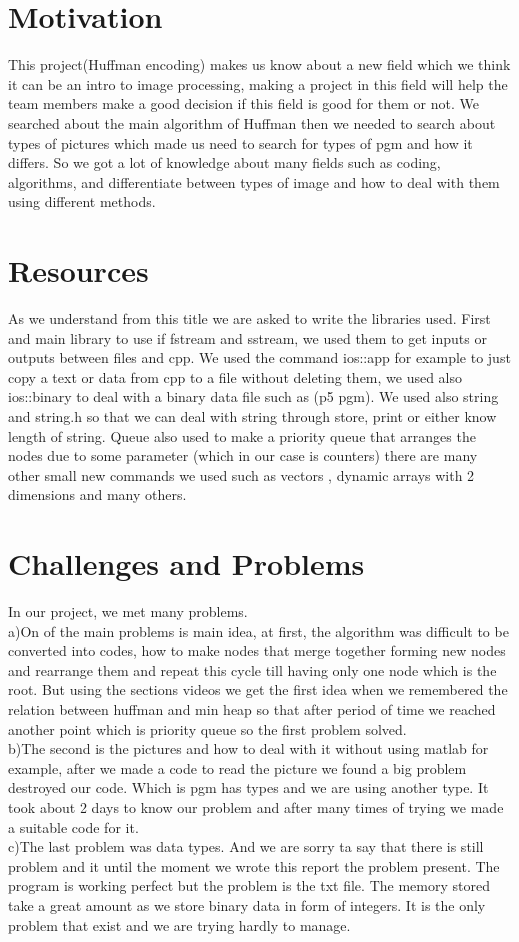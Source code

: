\documentclass[11 pt,twocolumn,letterpaper]{article}
\begin{document}
\section{Motivation}
   This project(Huffman encoding) makes us know about a new field which we think it can be an intro to image processing, making a project in this field will help the team members make a good decision if this field is good for them or not.
We searched about the main algorithm of Huffman then we needed to search about types of pictures which made us need to search for types of pgm and how it differs.
So we got a lot of knowledge about many fields such as coding, algorithms, and differentiate between types of image and how to deal with them using different methods.
\section{Resources}
  As we understand from this title we are asked to write the libraries used.
First and main library to use if fstream and sstream, we used them to get inputs or outputs between files and cpp.
We used the command ios::app for example to just copy a text or data from cpp to a file without deleting them, we used also ios::binary to deal with a binary data file such as (p5 pgm).
We used also string and string.h so that we can deal with string through store, print or either know length of string.
Queue also used to make a priority queue that arranges the nodes due to some parameter (which in our case is counters)
there are many other small new commands we used such as vectors , dynamic arrays with 2 dimensions and many others.
\section{Challenges and Problems}
In our project, we met many problems.\\
a)On of the main problems is main idea, at first, the algorithm was difficult to be converted into codes, how to make nodes that merge together forming new nodes and rearrange them and repeat this cycle till having only one node which is the root.
But using the sections videos we get the first idea when we remembered the relation between huffman and min heap so that after period of time we reached another point which is priority queue so the first problem solved.\\
b)The second is the pictures and how to deal with it without using matlab for example, after we made a code to read the picture we found a big problem destroyed our code. Which is pgm has types and we are using another type.
It took about 2 days to know our problem and after many times of trying we made a suitable code for it.\\
c)The last problem was data types. And we are sorry ta say that there is still problem and it until the moment we wrote this report the problem present.
The program is working perfect but the problem is the txt file. The memory stored take a great amount as we store binary data in form of integers. It is the only problem that exist and we are trying hardly to manage.\\
\end{document}

